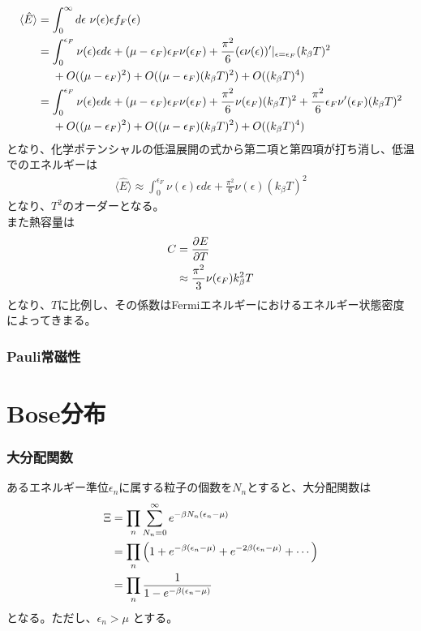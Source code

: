 \documentclass{jsarticle}  %
\numberwithin{equation}{section} %
\numberwithin{figure}{section}
\begin{document}
    \begin{align}
        \langle \hat{E} \rangle &= \int_0^{\infty} d\epsilon\ \nu (\epsilon) \epsilon f_F(\epsilon) \notag \\
        &= \int_0^{\epsilon_F} \nu (\epsilon) \epsilon d\epsilon + (\mu - \epsilon_F)\epsilon_F \nu(\epsilon_F)  + \frac{\pi^2}{6} (\epsilon \nu(\epsilon))'|_{\epsilon = \epsilon_F}(k_\beta T)^2 \notag \\
        &\ \ \ \ + O((\mu - \epsilon_F)^2) +O((\mu - \epsilon_F)(k_\beta T)^2) + O((k_\beta T)^4) \notag \\
        &= \int_0^{\epsilon_F} \nu (\epsilon) \epsilon d\epsilon + (\mu - \epsilon_F)\epsilon_F \nu(\epsilon_F)  + \frac{\pi^2}{6} \nu(\epsilon_F)(k_\beta T)^2 + \frac{\pi^2}{6} \epsilon_F \nu'(\epsilon_F)(k_\beta T)^2 \notag \\
        &\ \ \ \ + O((\mu - \epsilon_F)^2) +O((\mu - \epsilon_F)(k_\beta T)^2) + O((k_\beta T)^4) \notag 
    \end{align}
    となり、化学ポテンシャルの低温展開の式から第二項と第四項が打ち消し、低温でのエネルギーは
    \begin{align}
        \langle \hat{E} \rangle \approx \int_0^{\epsilon_F} \nu (\epsilon) \epsilon d\epsilon  + \frac{\pi^2}{6} \nu(\epsilon)(k_\beta T)^2 
    \end{align}
    となり、$T^2$のオーダーとなる。\\
    また熱容量は
    \begin{align}
        C &= \frac{\partial E}{\partial T} \notag \\
        &\approx  \frac{\pi^2}{3} \nu(\epsilon_F)k_\beta^2  T
    \end{align}
    となり、$T$に比例し、その係数はFermiエネルギーにおけるエネルギー状態密度によってきまる。
\subsubsection{Pauli常磁性}
\section{Bose分布}
\subsubsection{大分配関数}
    あるエネルギー準位$\epsilon_n$に属する粒子の個数を$N_n$とすると、大分配関数は
    \begin{align}
        \Xi &= \prod_n \sum_{N_n = 0}^{\infty} e^{-\beta N_n (\epsilon_n - \mu)} \notag \\
        &= \prod_n \left( 1 + e^{-\beta (\epsilon_n - \mu )} + e^{-2\beta (\epsilon_n - \mu )} + \cdots \right) \notag \\
        &= \prod_n \frac{1}{1 - e^{-\beta (\epsilon_n - \mu)}}
    \end{align}
    となる。ただし、$\epsilon_n > \mu$ とする。
\end{document}
